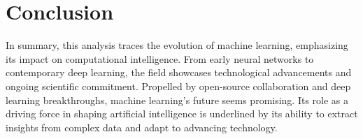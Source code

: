 \documentclass{article}
\begin{document}
\section{Conclusion}
In summary, this analysis traces the evolution of machine learning, emphasizing its impact on computational intelligence. From early neural networks to contemporary deep learning, the field showcases technological advancements and ongoing scientific commitment. Propelled by open-source collaboration and deep learning breakthroughs, machine learning's future seems promising. Its role as a driving force in shaping artificial intelligence is underlined by its ability to extract insights from complex data and adapt to advancing technology.
\nocite{*}

\end{document}
